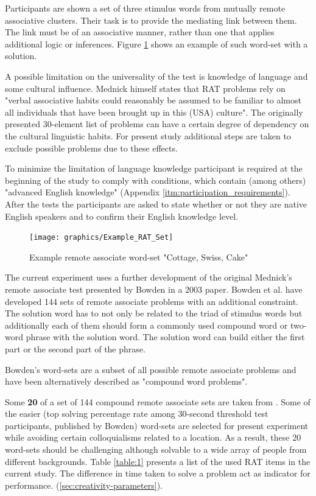 		Participants are shown a set of three stimulus words from mutually remote associative clusters. Their task is to provide the mediating link between them. The link must be of an associative manner, rather than one that applies additional logic or inferences. Figure \ref{fig:exampleratset} shows an example of such word-set with a solution.
		
		A possible limitation on the universality of the test is knowledge of language and some cultural influence. Mednick himself states that RAT problems rely on "verbal associative habits could reasonably be assumed to be familiar to almost all individuals that have been brought up in this (USA) culture". The originally presented 30-element list of problems can have a certain degree of dependency on the cultural linguistic habits. For present study additional steps are taken to exclude possible problems due to these effects. 
		
		To minimize the limitation of language knowledge participant is required at the beginning of the study to comply with conditions, which contain (among others) "advanced English knowledge" (Appendix \ref{itm:participation_requirements}). After the tests the participants are asked to state whether or not they are native English speakers and to confirm their English knowledge level.
		
		\begin{figure}[h]
			\centering
			\texttt{[image: graphics/Example\_RAT\_Set]}
			\caption{Example remote associate word-set "Cottage, Swiss, Cake"}
			\label{fig:exampleratset}
		\end{figure}

		The current experiment uses a further development of the original Mednick's remote associate test presented by Bowden in a 2003 paper. Bowden et al. \cite{Bowden} have developed 144 sets of remote associate problems with an additional constraint. The solution word has to not only be related to the triad of stimulus words but additionally each of them should form a commonly used compound word or two-word phrase with the solution word. The solution word can build either the first part or the second part of the phrase.
		
		Bowden's word-sets are a subset of all possible remote associate problems and have been alternatively described as "compound word problems".
		
		
		Some \textbf{20} of a set of 144 compound remote associate sets are taken from \cite{Bowden}. Some of the easier (top solving percentage rate among 30-second threshold test participants, published by Bowden) word-sets are selected for present experiment while avoiding certain colloquialisms related to a location. As a result, these 20 word-sets should be challenging although solvable to a wide array of people from different backgrounds. Table \ref{table:1} presents a list of the used RAT items in the current study. The difference in time taken to solve a problem act as indicator for performance. (\ref{sec:creativity-parameters}).
		
